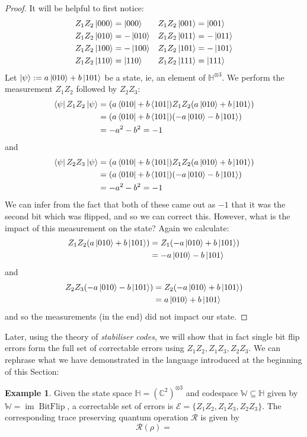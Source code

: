 \documentclass[12pt]{article}
\theoremstyle{plain}
\theoremstyle{definition}
\newtheorem{example}[thm]{Example}
\newcommand{\bb}[1]{\mathbb{#1}}
\newcommand{\scr}[1]{\mathscr{#1}}
\newcommand{\call}[1]{\mathcal{#1}}
\begin{document}
\begin{proof}
	It will be helpful to first notice:
	\begin{align*}
		Z_1Z_2\ket{000} &= \ket{000} & Z_1Z_2\ket{001} &= \ket{001}\\
		Z_1Z_2\ket{010} &= -\ket{010} & Z_1Z_2\ket{011} &= -\ket{011}\\
		Z_1Z_2\ket{100} &= -\ket{100} & Z_1Z_2\ket{101} &= -\ket{101}\\
		Z_1Z_2\ket{110} &= \ket{110} &Z_1Z_2 \ket{111} &= \ket{111}
	\end{align*}
	Let $\ket{\psi}:= a\ket{010} + b\ket{101}$ be a state, ie, an element of $\bb{H}^{\otimes 3}$. We perform the measurement $Z_1Z_2$ followed by $Z_2Z_3$:
	\begin{align*}
		\bra{\psi}Z_1Z_2\ket{\psi} &= (a\bra{010} + b\bra{101})Z_1Z_2(a\ket{010} + b\ket{101})\\
		&= (a\bra{010} + b\bra{101})(-a\ket{010} - b\ket{101})\\
		&= -a^2 - b^2 = -1
	\end{align*}
	and
	\begin{align*}
		\bra{\psi}Z_2Z_3\ket{\psi} &= (a\bra{010} + b\bra{101})Z_1Z_2(a\ket{010} + b\ket{101})\\
		&= (a\bra{010} + b\bra{101})(-a\ket{010} - b\ket{101})\\
		&= -a^2 - b^2 = -1
	\end{align*}
	We can infer from the fact that both of these came out as $-1$ that it was the second bit which was flipped, and so we can correct this. However, what is the impact of this measurement on the state? Again we calculate:
	\begin{align*}
		Z_1Z_2(a\ket{010} + b\ket{101}) &= Z_1(-a\ket{010} + b\ket{101})\\
		&= -a\ket{010} - b\ket{101}
	\end{align*}
	and
	\begin{align*}
		Z_2Z_3(-a\ket{010} - b\ket{101}) &= Z_2(-a\ket{010} + b\ket{101})\\
		&= a\ket{010} + b\ket{101}
	\end{align*}
	and so the measurements (in the end) did not impact our state.
\end{proof}
Later, using the theory of \emph{stabiliser codes}, we will show that in fact single bit flip errors form the full set of correctable errors using $Z_1Z_2,Z_1Z_3,Z_2Z_3$. We can rephrase what we have demonstrated in the language introduced at the beginning of this Section:
\begin{example}\label{ex:bitflip_error}
	Given the state space $\bb{H} = (\bb{C}^2)^{\otimes 3}$ and codespace $\bb{W} \subseteq \bb{H}$ given by $\bb{W} = \operatorname{im}\operatorname{BitFlip}$, a correctable set of errors is $\scr{E} = \lbrace Z_1Z_2,Z_1Z_3,Z_2Z_3\rbrace$. The corresponding trace preserving quantum operation $\call{R}$ is given by
	\begin{equation}
		\call{R}(\rho) = 
	\end{equation}
\end{example}
\end{document}
